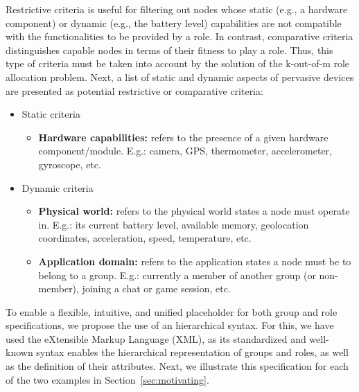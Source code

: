 
Restrictive criteria is useful for filtering out nodes whose static (e.g., a hardware component) or dynamic (e.g., the battery level) capabilities are not compatible with the functionalities to be provided by a role. In contrast, comparative criteria distinguishes capable nodes in terms of their fitness to play a role. Thus, this type of criteria must be taken into account by the solution of the k-out-of-m role allocation problem. Next, a list of static and dynamic aspects of pervasive devices are presented as potential restrictive or comparative criteria:

\begin{itemize}
	
	\item Static criteria
	
	\begin{itemize}
		\item \textbf{Hardware capabilities:} refers to the presence of a given hardware component/module. E.g.: camera, GPS, thermometer, accelerometer, gyroscope, etc.
	\end{itemize}
	
	\item Dynamic criteria
	
	\begin{itemize}
		\item \textbf{Physical world:} refers to the physical world states a node must operate in. E.g.: its current battery level, available memory, geolocation coordinates, acceleration, speed, temperature, etc.
		
		\item \textbf{Application domain:} refers to the application states a node must be to belong to a group. E.g.: currently a member of another group (or non-member), joining a chat or game session, etc.
	\end{itemize}
\end{itemize}



To enable a flexible, intuitive, and unified placeholder for both group and role specifications, we propose the use of an hierarchical syntax. For this, we have used the eXtensible Markup Language (XML), as its standardized and well-known syntax enables the hierarchical representation of groups and roles, as well as the definition of their attributes. Next, we illustrate this specification for each of the two examples in Section~\ref{sec:motivating}.

